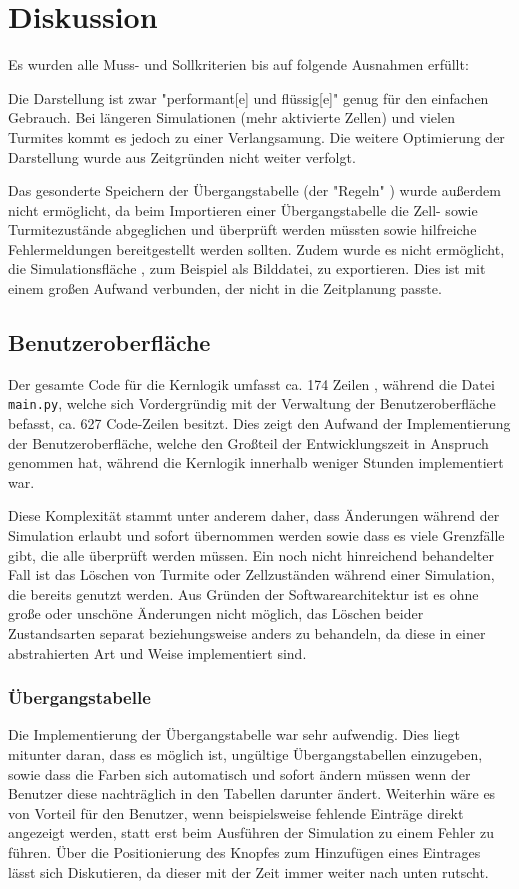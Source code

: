 \section{Diskussion}
Es wurden alle Muss- und Sollkriterien bis auf folgende Ausnahmen erfüllt:

Die Darstellung \cite[1.2.1]{pflichtenheft} ist zwar "performant[e] und flüssig[e]" genug für den einfachen Gebrauch. Bei längeren Simulationen (mehr aktivierte Zellen) und vielen Turmites kommt es jedoch zu einer Verlangsamung. Die weitere Optimierung der Darstellung wurde aus Zeitgründen nicht weiter verfolgt.

Das gesonderte Speichern der Übergangstabelle (der "Regeln" \cite[1.1.6]{pflichtenheft}) wurde außerdem nicht ermöglicht, da beim Importieren einer Übergangstabelle die Zell- sowie Turmitezustände abgeglichen und überprüft werden müssten sowie hilfreiche Fehlermeldungen bereitgestellt werden sollten. Zudem wurde es nicht ermöglicht, die Simulationsfläche \cite[1.1.6]{pflichtenheft}, zum Beispiel als Bilddatei, zu exportieren. Dies ist mit einem großen Aufwand verbunden, der nicht in die Zeitplanung passte.

\subsection{Benutzeroberfläche}
Der gesamte Code für die Kernlogik umfasst ca. 174 Zeilen \cite{cloc}, während die Datei \texttt{main.py}, welche sich Vordergründig mit der Verwaltung der Benutzeroberfläche befasst, ca. 627 Code-Zeilen \cite{cloc} besitzt. Dies zeigt den Aufwand der Implementierung der Benutzeroberfläche, welche den Großteil der Entwicklungszeit in Anspruch genommen hat, während die Kernlogik innerhalb weniger Stunden implementiert war.

Diese Komplexität stammt unter anderem daher, dass Änderungen während der Simulation erlaubt und sofort übernommen werden sowie dass es viele Grenzfälle gibt, die alle überprüft werden müssen. Ein noch nicht hinreichend behandelter Fall ist das Löschen von Turmite oder Zellzuständen während einer Simulation, die bereits genutzt werden. Aus Gründen der Softwarearchitektur ist es ohne große oder unschöne Änderungen nicht möglich, das Löschen beider Zustandsarten separat beziehungsweise anders zu behandeln, da diese in einer abstrahierten Art und Weise implementiert sind.

\subsubsection{Übergangstabelle}
Die Implementierung der Übergangstabelle war sehr aufwendig. Dies liegt mitunter daran, dass es möglich ist, ungültige Übergangstabellen einzugeben, sowie dass die Farben sich automatisch und sofort ändern müssen wenn der Benutzer diese nachträglich in den Tabellen darunter ändert. Weiterhin wäre es von Vorteil für den Benutzer, wenn beispielsweise fehlende Einträge direkt angezeigt werden, statt erst beim Ausführen der Simulation zu einem Fehler zu führen. Über die Positionierung des Knopfes zum Hinzufügen eines Eintrages lässt sich Diskutieren, da dieser mit der Zeit immer weiter nach unten rutscht.

